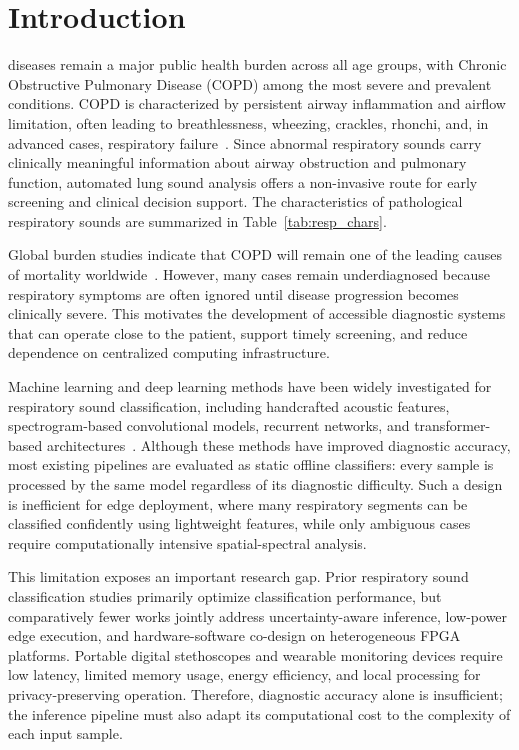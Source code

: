 \section{Introduction}
\label{sec:introduction}
 diseases remain a major public health burden across all age groups, with Chronic Obstructive Pulmonary Disease (COPD) among the most severe and prevalent conditions. COPD is characterized by persistent airway inflammation and airflow limitation, often leading to breathlessness, wheezing, crackles, rhonchi, and, in advanced cases, respiratory failure~\cite{b01}. Since abnormal respiratory sounds carry clinically meaningful information about airway obstruction and pulmonary function, automated lung sound analysis offers a non-invasive route for early screening and clinical decision support. The characteristics of pathological respiratory sounds are summarized in Table~\ref{tab:resp_chars}.

Global burden studies indicate that COPD will remain one of the leading causes of mortality worldwide~\cite{b02,b03}. However, many cases remain underdiagnosed because respiratory symptoms are often ignored until disease progression becomes clinically severe. This motivates the development of accessible diagnostic systems that can operate close to the patient, support timely screening, and reduce dependence on centralized computing infrastructure.

Machine learning and deep learning methods have been widely investigated for respiratory sound classification, including handcrafted acoustic features, spectrogram-based convolutional models, recurrent networks, and transformer-based architectures~\cite{b07,b08,b09,b10,b11,b12,b13,b14,b15}. Although these methods have improved diagnostic accuracy, most existing pipelines are evaluated as static offline classifiers: every sample is processed by the same model regardless of its diagnostic difficulty. Such a design is inefficient for edge deployment, where many respiratory segments can be classified confidently using lightweight features, while only ambiguous cases require computationally intensive spatial-spectral analysis.

This limitation exposes an important research gap. Prior respiratory sound classification studies primarily optimize classification performance, but comparatively fewer works jointly address uncertainty-aware inference, low-power edge execution, and hardware-software co-design on heterogeneous FPGA platforms. Portable digital stethoscopes and wearable monitoring devices require low latency, limited memory usage, energy efficiency, and local processing for privacy-preserving operation. Therefore, diagnostic accuracy alone is insufficient; the inference pipeline must also adapt its computational cost to the complexity of each input sample.

